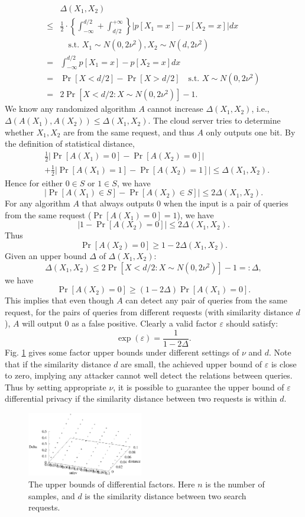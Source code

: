 \documentclass{article}
\begin{document}
$$
\begin{aligned}
&\Delta(X_1, X_2) \\
\leq& \frac{1}{2}\cdot\left\{ \int_{-\infty}^{d/2} + \int_{d/2}^{+\infty} \right\} \bigg|p[X_1 = x] - p[X_2 = x]\bigg|dx \\
&\quad \textrm{s.t. } X_1\sim N(0,2\nu^2), X_2\sim N(d,2\nu^2)\\
=& \int_{-\infty}^{d/2} p[X_1 = x] - p[X_2 = x] dx \\
=& \Pr[X<d/2] - \Pr[X>d/2] \quad \textrm{s.t. } X\sim N(0,2\nu^2) \\
=& 2\Pr[X<d/2: X\sim N(0,2\nu^2)]-1.
\end{aligned}
$$
We know any randomized algorithm $A$ cannot increase $\Delta(X_1, X_2)$, i.e., $\Delta(A(X_1), A(X_2)) \leq \Delta(X_1, X_2)$. The cloud server tries to determine whether $X_1, X_2$ are from the same request, and thus $A$ only outputs one bit. By the definition of statistical distance,
$$\begin{aligned}
&\frac{1}{2}|\Pr[A(X_1)=0]-\Pr[A(X_2)=0]| \\
&+ \frac{1}{2}|\Pr[A(X_1)=1]-\Pr[A(X_2)=1]| 
\leq \Delta(X_1, X_2).
\end{aligned}$$
Hence for either $0\in S$ or $1\in S$, we have
$$|\Pr[A(X_1)\in S]-\Pr[A(X_2)\in S]| \leq 2 \Delta(X_1, X_2).$$
For any algorithm $A$ that always outputs 0 when the input is a pair of queries from the same request ($\Pr[A(X_1)=0]=1$), we have
$$|1-\Pr[A(X_2)=0]| \leq 2 \Delta(X_1, X_2).$$
Thus
$$\Pr[A(X_2)=0] \geq 1-2 \Delta(X_1, X_2).$$
Given an upper bound $\Delta$ of $\Delta(X_1, X_2)$:
$$\Delta(X_1, X_2) \leq 2\Pr[X<d/2: X\sim N(0,2\nu^2)]-1 =: \Delta,$$
we have
$$\Pr[A(X_2)=0] \geq (1-2 \Delta)\Pr[A(X_1)=0].$$
This implies that even though $A$ can detect any pair of queries from the same request, for the pairs of queries from different requests (with similarity distance $d$), $A$ will output 0 as a false positive. Clearly a valid factor $\varepsilon$ should satisfy:
$$\exp(\varepsilon) = \frac{1}{1-2\Delta}.$$
Fig. \ref{fig:diff_factors} gives some factor upper bounds under different settings of $\nu$ and $d$. Note that if the similarity distance $d$ are small, the achieved upper bound of $\varepsilon$ is close to zero, implying any attacker cannot well detect the relations between queries. Thus by setting appropriate $\nu$, it is possible to guarantee the upper bound of $\varepsilon$ differential privacy if the similarity distance between two requests is within $d$.

\begin{figure}
\centering
\includegraphics[width=0.45\textwidth]{stdev1samples.eps}
\caption{The upper bounds of differential factors. Here $n$ is the number of samples, and $d$ is the similarity distance between two search requests.}
\label{fig:diff_factors}
\end{figure}



\end{document}
